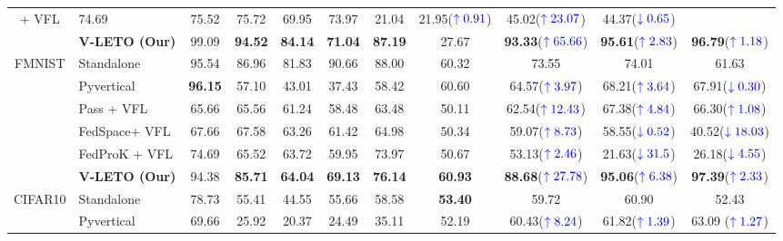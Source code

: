 \begin{table*}[!t]
\begin{tabular}{clccccc|cccc}
+ VFL           & 74.69      & 75.52   & 75.72 & 69.95 & 73.97 &21.04   & 21.95(${\color{blue}\uparrow0.91}$) & 45.02(${\color{blue}\uparrow23.07}$) & 44.37(${\color{blue}\downarrow0.65}$) \\
& \textbf{V-LETO (Our)}                & 99.09      & \textbf{94.52} & \textbf{84.14}  &  \textbf{71.04} & \textbf{87.19}  & 27.67      & \textbf{93.33}(${\color{blue}\uparrow65.66}$) & \textbf{95.61}(${\color{blue}\uparrow2.83}$)  &  \textbf{96.79}(${\color{blue}\uparrow1.18}$) \\ \midrule 
\multirow{6}{*}{FMNIST}
 & Standalone                  &   95.54      &  86.96    &  81.83  & 90.66 & 88.00 & 60.32     & 73.55  &74.01 & 61.63\\
& Pyvertical 
&  \textbf{96.15}&  57.10    & 43.01  & 37.43 &  58.42 & 60.60    & 64.57(${\color{blue}\uparrow 3.97}$)  & 68.21(${\color{blue}\uparrow 3.64}$) & 67.91(${\color{blue}\downarrow 0.30}$) \\
&Pass 
+ VFL             & 65.66     & 65.56   & 61.24 & 58.48 & 63.48 &  50.11  & 62.54(${\color{blue}\uparrow12.43}$)  & 67.38(${\color{blue}\uparrow4.84}$) 
& 66.30(${\color{blue}\uparrow1.08}$) \\
&FedSpace+ VFL 
 & 67.66     & 67.58   & 63.26 & 61.42 & 64.98 & 50.34  &59.07(${\color{blue}\uparrow8.73}$)  & 58.55(${\color{blue}\downarrow0.52}$) & 40.52(${\color{blue}\downarrow18.03}$)
\\
&FedProK 
+ VFL          & 74.69      & 65.52   & 63.72 & 59.95 & 73.97& 50.67  &53.13(${\color{blue}\uparrow2.46}$)  & 21.63(${\color{blue}\downarrow31.5}$) &26.18(${\color{blue}\downarrow4.55}$) \\
& \textbf{V-LETO (Our)}    & 94.38       &  \textbf{85.71} &   \textbf{64.04}  &  \textbf{69.13} & \textbf{76.14} & \textbf{60.93 }     &  \textbf{88.68}(${\color{blue}\uparrow27.78}$) &\textbf{95.06}(${\color{blue}\uparrow6.38}$)    & \textbf{97.39}(${\color{blue}\uparrow2.33}$)  \\ \midrule
\multirow{6}{*}{CIFAR10} & Standalone                  & 78.73     & 55.41   & 44.55 & 55.66 &  58.58 &\textbf{53.40}   &59.72  &60.90  &52.43  \\
& Pyvertical          &  69.66 &  25.92   & 20.37&  24.49 &  35.11 &52.19   &60.43(${\color{blue}\uparrow8.24}$)  &61.82(${\color{blue}\uparrow1.39}$)  & 63.09 (${\color{blue}\uparrow1.27}$)\\

\end{tabular}
\end{table*}
